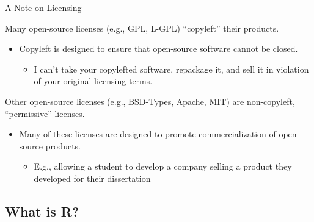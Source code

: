 \documentclass[10pt]{beamer}
\begin{document}
\begin{frame}{A Note on Licensing}

  Many open-source licenses (e.g., GPL, L-GPL) ``copyleft'' their products.
  \vb
  \begin{itemize}
  \item Copyleft is designed to ensure that open-source software cannot be 
    closed.
    \vc
    \begin{itemize}
    \item I can't take your copylefted software, repackage it, and sell it in 
      violation of your original licensing terms.
    \end{itemize}
  \end{itemize}
  \va
  Other open-source licenses (e.g., BSD-Types, Apache, MIT) are non-copyleft, 
  ``permissive'' licenses.
  \vb
  \begin{itemize}
  \item Many of these licenses are designed to promote commercialization of 
    open-source products.
    \vc
    \begin{itemize}
    \item E.g., allowing a student to develop a company selling a product they 
      developed for their dissertation
    \end{itemize}
  \end{itemize}
  
\end{frame}




\subsection{What is R?}

\end{document}
